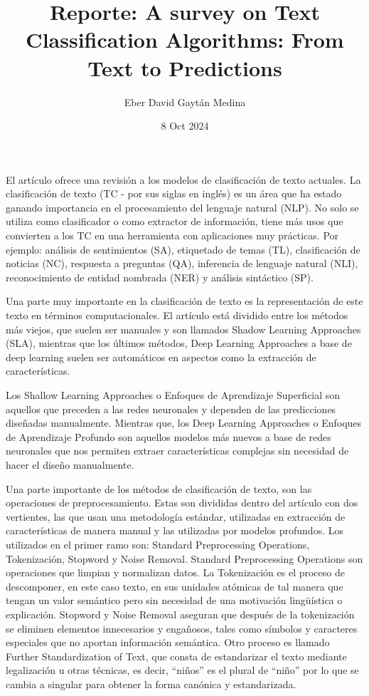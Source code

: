 \documentclass[letterpaper,12pt]{article}
\title{Reporte: A survey on Text Classification Algorithms: From Text to Predictions}
\author{Eber David Gaytán Medina}
\date{8 Oct 2024}
\begin{document}
\maketitle

El artículo ofrece una revisión a los modelos de clasificación de texto 
actuales. La clasificación de texto (TC - por sus siglas en inglés) es un área 
que ha estado ganando importancia en el procesamiento del lenguaje 
natural (NLP). No solo se utiliza como clasificador o como extractor de 
información, tiene más usos que convierten a los TC en una herramienta con 
aplicaciones muy prácticas. Por ejemplo: análisis de sentimientos (SA), 
etiquetado de temas (TL), clasificación de noticias (NC), respuesta a 
preguntas (QA), inferencia de lenguaje natural (NLI), reconocimiento de 
entidad nombrada (NER) y análisis sintáctico (SP). 

Una parte muy importante en la clasificación de texto es la representación 
de este texto en términos computacionales. El artículo está dividido entre
los métodos más viejos, que suelen ser manuales y son llamados Shadow Learning
Approaches (SLA), mientras que los últimos métodos, Deep Learning Approaches 
a base de deep learning suelen ser automáticos en aspectos como la extracción 
de características.

Los Shallow Learning Approaches o Enfoques de Aprendizaje Superficial son
aquellos que preceden a las redes neuronales y dependen de las predicciones
diseñadas manualmente. Mientras que, los Deep Learning Approaches o Enfoques 
de Aprendizaje Profundo son aquellos modelos más nuevos a base de redes 
neuronales que nos permiten extraer características complejas sin necesidad 
de hacer el diseño manualmente.

Una parte importante de los métodos de clasificación de texto, son las 
operaciones de preprocesamiento. Estas son divididas dentro del artículo 
con dos vertientes, las que usan una metodología estándar, utilizadas en 
extracción de características de manera manual y las utilizadas por modelos
profundos. Los utilizados en el primer ramo son: Standard Preprocessing 
Operations, Tokenización, Stopword y Noise Removal. Standard Preprocessing 
Operations son operaciones que limpian y normalizan datos. La Tokenización 
es el proceso de descomponer, en este caso texto, en sus unidades atómicas 
de tal manera que tengan un valor semántico pero sin necesidad de una 
motivación lingüística o explicación. Stopword y Noise Removal aseguran que
después de la tokenización se eliminen elementos innecesarios y engañosos, tales 
como símbolos y caracteres especiales que no aportan información semántica.
Otro proceso es llamado Further Standardization of Text, que consta de estandarizar 
el texto mediante legalización u otras técnicas, es decir, ``niños'' es el plural de 
``niño'' por lo que se cambia a singular para obtener la forma canónica y 
estandarizada.
\end{document}
